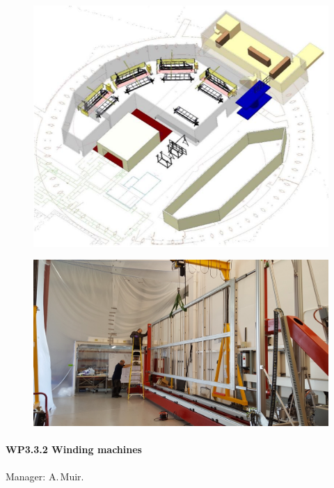 \begin{figure}
\RawFloats
    \centering
\begin{minipage}{.47\textwidth}
  \centering
    \includegraphics[width=\linewidth]{figs/WP3/FactoryLayout.png}
    \label{fig:APAFactory}
    \end{minipage}
\hspace{0.03\textwidth}
\begin{minipage}{.47\textwidth}
    \centering
    \includegraphics[width=\linewidth]{figs/WP3/TheNewWinder.png}
    \label{fig:WindingMachine}
\end{minipage}
\end{figure}

\paragraph{WP3.3.2 Winding machines} Manager: A.\,Muir.

